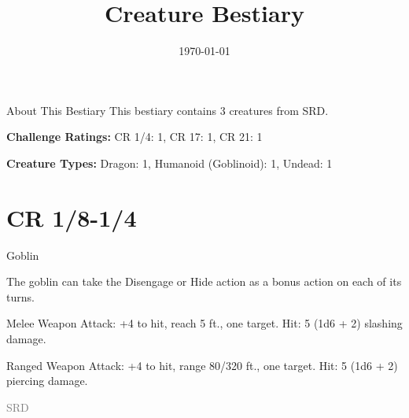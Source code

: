 \documentclass[letterpaper, 11pt, bg=full, twocolumn, stats=modern]{dndbook}
\title{Creature Bestiary}
\date{\today}
\begin{document}
\tableofcontents
\clearpage

\begin{DndComment}{About This Bestiary}
This bestiary contains 3 creatures from SRD.

\textbf{Challenge Ratings:} CR 1/4: 1, CR 17: 1, CR 21: 1

\textbf{Creature Types:} Dragon: 1, Humanoid (Goblinoid): 1, Undead: 1
\end{DndComment}

\vspace{1em}

\section{CR 1/8-1/4}

\vspace{0.5em}


\begin{DndMonster}[float=tp]{Goblin}
\noindent {}
\DndMonsterBasics[
    armor-class = {15 (\textit{leather armor}, \textit{shield})},
    hit-points = {7 (2d6)},
    speed = {30 ft.},
    initiative = +2
]
\DndMonsterAbilityScores[
    str = 8,
    dex = 14,
    con = 10,
    int = 10,
    wis = 8,
    cha = 8,
]

\DndMonsterDetails[
    skills = {Stealth +6},
    senses = {darkvision 60 ft.},
    languages = {Common, Goblin},
    challenge = {1/4 (50 XP)}
]

The goblin can take the Disengage or Hide action as a bonus action on each of its turns.

Melee Weapon Attack: +4 to hit, reach 5 ft., one target. Hit: 5 (1d6 + 2) slashing damage.

Ranged Weapon Attack: +4 to hit, range 80/320 ft., one target. Hit: 5 (1d6 + 2) piercing damage.

\vspace{2pt}
\noindent\hfill{\scriptsize\textcolor{gray}{SRD}}

\end{DndMonster}

\vspace{2em}

\FloatBarrier
\end{document}
